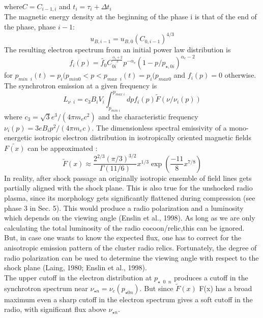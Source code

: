 \documentclass[12pt]{report}
\newcommand{\cc}[1]{\left({#1}\right)}
\begin{document}
where$C=C_{i-1,i}$ and $t_i=\tau_i+\Delta t_i$\\
The magnetic energy density at the beginning of the phase i is that of the end of the phase, phase $i-1$:
\begin{equation}
u_{B,i-1}=u_{B,0}(C_{0,i-1})^{4/3}
\end{equation}
The resulting electron spectrum from an initial power law distribution is 
\begin{equation}
f_i(p)=\tilde{f_0}C^{\frac{\alpha_e+2}{3}}_{0i} p^{-\alpha_e}(1-p/p_{\star,0i})^{\alpha_e-2}
\end{equation}
for $p_{min\;\;i}(t)=p_i(p_{min0}<p<p_{max\;\;i}(t)=p_i(p_{max0}$ and $f_i(p)=0$ otherwise.\\
The synchrotron emission at a given frequency is 
\begin{equation}
L_{\nu\;\;i}=c_3B_i V_i \int^{p_{max\;i}} _{p_{min \; i}} dpf_i(p) \tilde{F}(\nu/\nu_i(p))
\end{equation}
where $c_3=\sqrt{3}e^3/(4 \pi m_e c^2)$ and the characteristic frequency $\nu_i(p)=3eB_ip^2/(4 \pi m_e c)$. The dimensionless spectral emissivity of a mono-energetic isotropic electron distribution in isotropically oriented magnetic fields $\tilde{F(x)}$ can be approximated :
\begin{equation}
\tilde{F}(x)\approx \frac{2^{2/3}(\pi/3)^{3/2}}{\Gamma(11/6)}x^{1/3}\exp\cc{\frac{-11}{8}x^{7/8}}
\end{equation}
In reality, after shock passage an originally isotropic ensemble of field lines gets partially aligned with the shock plane. This is also true for the unshocked radio plasma, since its morphology gets significantly flattened during compression (see phase 3 in Sec. 5). This would produce a radio polarization and a luminosity which depends on the viewing angle (Enslin et al., 1998). As long as we are only calculating the total luminosity of the radio cocoon/relic,this can be ignored. But, in case one wants to know the expected flux, one has to correct for the anisotropic emission pattern of the cluster radio relics. Fortunately, the degree of radio polarization can be used to determine the viewing angle with respect to the shock plane (Laing, 1980; Enslin et al., 1998).\\
The upper cutoff in the electron distribution at $p_{\star \;\; 0 \; \;n}$ produces a cutoff in the synchrotron spectrum near $\nu_{\star n} = \nu_c(p_{\star 0n})$. But since $\tilde{F}(x)$  F(x) has a broad maximum even a sharp cutoff in the electron spectrum gives a soft cutoff in the radio, with significant flux above $\nu_{\star n}$.
\end{document}
